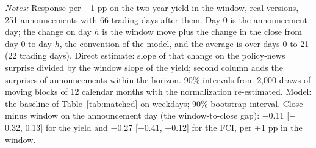 \begin{table}[tp]\centering\footnotesize\setlength{\tabcolsep}{3pt}
\caption{Financial Persistence: Direct Estimates and the Model}\label{tab:persist}
\begin{flushleft}\footnotesize\textit{Notes:} Response per +1 pp on the two-year yield in the window, real versions, 251 announcements with 66 trading days after them. Day 0 is the announcement day; the change on day $h$ is the window move plus the change in the close from day 0 to day $h$, the convention of the model, and the average is over days 0 to 21 (22 trading days). Direct estimate: slope of that change on the policy-news surprise divided by the window slope of the yield; second column adds the surprises of announcements within the horizon. 90\% intervals from 2,000 draws of moving blocks of 12 calendar months with the normalization re-estimated. Model: the baseline of Table~\ref{tab:matched} on weekdays; 90\% bootstrap interval. Close minus window on the announcement day (the window-to-close gap): $-$0.11 [$-$0.32, 0.13] for the yield and $-$0.27 [$-$0.41, $-$0.12] for the FCI, per +1 pp in the window.\end{flushleft}
\end{table}

